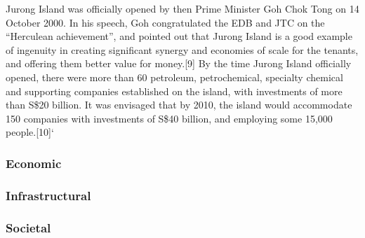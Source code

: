 \documentclass[a4paper,10pt]{article}
\begin{document}
Jurong Island was officially opened by then Prime Minister Goh Chok Tong on 14 October 2000. In his speech, Goh congratulated the EDB and JTC on the “Herculean achievement”, and pointed out that Jurong Island is a good example of ingenuity in creating significant synergy and economies of scale for the tenants, and offering them better value for money.[9] By the time Jurong Island officially opened, there were more than 60 petroleum, petrochemical, specialty chemical and supporting companies established on the island, with investments of more than S\$20 billion. It was envisaged that by 2010, the island would accommodate 150 companies with investments of S\$40 billion, and employing some 15,000 people.[10]`

\subsubsection{Economic}

\subsubsection{Infrastructural}

\subsubsection{Societal}

 

\end{document}
